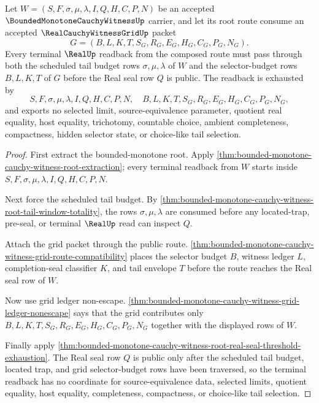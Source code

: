 \begin{theorem}
\label{thm:bounded-monotone-cauchy-witness-budget-cofinal-readback}
Let $W=(S,F,\sigma,\mu,\lambda,I,Q,H,C,P,N)$ be an accepted $\BoundedMonotoneCauchyWitnessUp$ carrier, and let its root route consume an accepted $\RealCauchyWitnessGridUp$ packet
$$
G=(B,L,K,T,S_G,R_G,E_G,H_G,C_G,P_G,N_G).
$$
Every terminal $\RealUp$ readback from the composed route must pass through both the scheduled tail budget rows $\sigma,\mu,\lambda$ of $W$ and the selector-budget rows $B,L,K,T$ of $G$ before the Real seal row $Q$ is public. The readback is exhausted by
$$
S,F,\sigma,\mu,\lambda,I,Q,H,C,P,N,\quad B,L,K,T,S_G,R_G,E_G,H_G,C_G,P_G,N_G,
$$
and exports no selected limit, source-equivalence parameter, quotient real equality, host equality, trichotomy, countable choice, ambient completeness, compactness, hidden selector state, or choice-like tail selection.
\end{theorem}
\begin{proof}
First extract the bounded-monotone root. Apply \autoref{thm:bounded-monotone-cauchy-witness-root-extraction}; every terminal readback from $W$ starts inside $S,F,\sigma,\mu,\lambda,I,Q,H,C,P,N$.

Next force the scheduled tail budget. By \autoref{thm:bounded-monotone-cauchy-witness-root-tail-window-totality}, the rows $\sigma,\mu,\lambda$ are consumed before any located-trap, pre-seal, or terminal $\RealUp$ read can inspect $Q$.

Attach the grid packet through the public route. \autoref{thm:bounded-monotone-cauchy-witness-grid-route-compatibility} places the selector budget $B$, witness ledger $L$, completion-seal classifier $K$, and tail envelope $T$ before the route reaches the Real seal row of $W$.

Now use grid ledger non-escape. \autoref{thm:bounded-monotone-cauchy-witness-grid-ledger-nonescape} says that the grid contributes only $B,L,K,T,S_G,R_G,E_G,H_G,C_G,P_G,N_G$ together with the displayed rows of $W$.

Finally apply \autoref{thm:bounded-monotone-cauchy-witness-root-real-seal-threshold-exhaustion}. The Real seal row $Q$ is public only after the scheduled tail budget, located trap, and grid selector-budget rows have been traversed, so the terminal readback has no coordinate for source-equivalence data, selected limits, quotient equality, host equality, completeness, compactness, or choice-like tail selection.
\end{proof}

